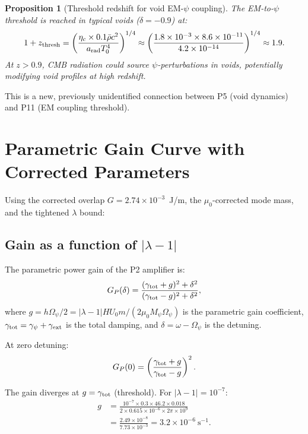 \documentclass[11pt,twocolumn]{article}
\newcommand{\lam}{\lambda}
\newcommand{\Opsi}{\Omega_\psi}
\newcommand{\gpsi}{\gamma_\psi}
\newcommand{\Mpsi}{M_\psi}
\newtheorem{proposition}{Proposition}
\begin{document}
\begin{proposition}[Threshold redshift for void EM-$\psi$ coupling]
The EM-to-$\psi$ threshold is reached in typical voids
($\delta = -0.9$) at:
\begin{equation}
1 + z_{\rm thresh} = \left(\frac{\eta_c \times 0.1\bar{\rho}c^2}
{a_{\rm rad}T_0^4}\right)^{1/4}
\approx \left(\frac{1.8\times10^{-3} \times 8.6\times10^{-11}}
{4.2\times10^{-14}}\right)^{1/4}
\approx 1.9.
\end{equation}
At $z > 0.9$, CMB radiation could source $\psi$-perturbations in voids,
potentially modifying void profiles at high redshift.
\end{proposition}

This is a new, previously unidentified connection between P5 (void dynamics)
and P11 (EM coupling threshold).


\section{Parametric Gain Curve with Corrected Parameters}
\label{sec:gain_curve}

Using the corrected overlap $G = 2.74\times10^{-3}$~J/m, the
$\mu_0$-corrected mode mass, and the tightened $\lam$ bound:

\subsection{Gain as a function of $|\lam-1|$}

The parametric power gain of the P2 amplifier is:
\begin{equation}
G_P(\delta) = \frac{(\gamma_{\rm tot} + g)^2 + \delta^2}
{(\gamma_{\rm tot} - g)^2 + \delta^2},
\end{equation}
where $g = h\Opsi/2 = |\lam-1| H U_0 m/(2\mu_0\Mpsi\Opsi)$ is the
parametric gain coefficient, $\gamma_{\rm tot} = \gpsi + \gamma_{\rm ext}$
is the total damping, and $\delta = \omega - \Opsi$ is the detuning.

At zero detuning:
\begin{equation}
G_P(0) = \left(\frac{\gamma_{\rm tot} + g}
{\gamma_{\rm tot} - g}\right)^2.
\end{equation}

The gain diverges at $g = \gamma_{\rm tot}$ (threshold).
For $|\lam-1| = 10^{-7}$:
\begin{align}
g &= \frac{10^{-7} \times 0.3 \times 46.2 \times 0.018}
{2 \times 0.615 \times 10^{-6} \times 2\pi\times10^9}
\nonumber\\
&= \frac{2.49\times10^{-8}}{7.73\times10^{-3}}
= 3.2\times10^{-6}~\text{s}^{-1}.
\end{align}
\end{document}

